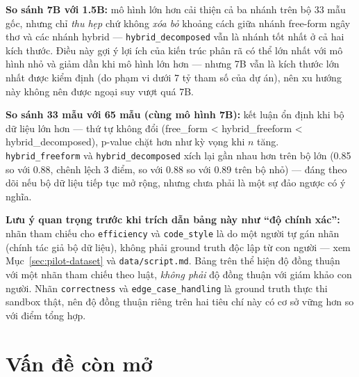\documentclass[a4paper,12pt]{report}
\begin{document}
\textbf{So sánh 7B với 1.5B:} mô hình lớn hơn cải thiện cả ba nhánh trên bộ
33 mẫu gốc, nhưng chỉ \emph{thu hẹp} chứ không \emph{xóa bỏ} khoảng cách
giữa nhánh free-form ngây thơ và các nhánh hybrid — \texttt{hybrid\_decomposed}
vẫn là nhánh tốt nhất ở cả hai kích thước. Điều này gợi ý lợi ích của kiến
trúc phân rã có thể lớn nhất với mô hình nhỏ và giảm dần khi mô hình lớn
hơn — nhưng 7B vẫn là kích thước lớn nhất được kiểm định (do phạm vi dưới
7 tỷ tham số của dự án), nên xu hướng này không nên được ngoại suy vượt
quá 7B.

\textbf{So sánh 33 mẫu với 65 mẫu (cùng mô hình 7B):} kết luận ổn định khi
bộ dữ liệu lớn hơn — thứ tự không đổi (free\_form < hybrid\_freeform <
hybrid\_decomposed), p-value chặt hơn như kỳ vọng khi $n$ tăng.
\texttt{hybrid\_freeform} và \texttt{hybrid\_decomposed} xích lại gần nhau
hơn trên bộ lớn (0.85 so với 0.88, chênh lệch 3 điểm, so với 0.88 so với
0.89 trên bộ nhỏ) — đáng theo dõi nếu bộ dữ liệu tiếp tục mở rộng, nhưng
chưa phải là một sự đảo ngược có ý nghĩa.

\textbf{Lưu ý quan trọng trước khi trích dẫn bảng này như ``độ chính
xác'':} nhãn tham chiếu cho \texttt{efficiency} và \texttt{code\_style} là
do một người tự gán nhãn (chính tác giả bộ dữ liệu), không phải ground
truth độc lập từ con người — xem Mục~\ref{sec:pilot-dataset} và
\texttt{data/script.md}. Bảng trên thể hiện độ đồng thuận với một nhãn
tham chiếu theo luật, \emph{không phải} độ đồng thuận với giám khảo con
người. Nhãn \texttt{correctness} và \texttt{edge\_case\_handling} là ground
truth thực thi sandbox thật, nên độ đồng thuận riêng trên hai tiêu chí này
có cơ sở vững hơn so với điểm tổng hợp.

\section{Vấn đề còn mở}
\label{sec:results-open-items}
\end{document}
